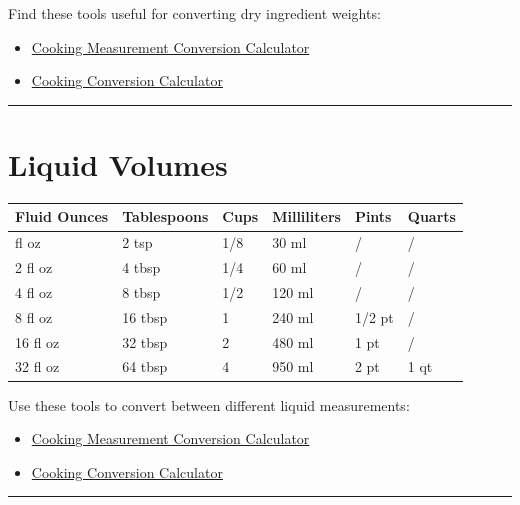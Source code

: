\documentclass[
]{book}
\providecommand{\tightlist}{%
  \setlength{\itemsep}{0pt}\setlength{\parskip}{0pt}}
\begin{document}
Find these tools useful for converting dry ingredient weights:

\begin{itemize}
\tightlist
\item
  \href{https://goodcalculators.com/cooking-conversion-calculator/}{Cooking
  Measurement Conversion Calculator}
\item
  \href{https://www.inchcalculator.com/cooking-conversion-calculator/}{Cooking
  Conversion Calculator}
\end{itemize}

\begin{center}\rule{0.5\linewidth}{0.5pt}\end{center}

\section*{Liquid Volumes}\label{liquid-volumes}

\begin{longtable}[]{@{}llllll@{}}
\toprule\noalign{}
Fluid Ounces & Tablespoons & Cups & Milliliters & Pints & Quarts \\
\midrule\noalign{}
\endhead
\bottomrule\noalign{}
\endlastfoot
1 fl oz & 2 tsp & 1/8 & 30 ml & / & / \\
2 fl oz & 4 tbsp & 1/4 & 60 ml & / & / \\
4 fl oz & 8 tbsp & 1/2 & 120 ml & / & / \\
8 fl oz & 16 tbsp & 1 & 240 ml & 1/2 pt & / \\
16 fl oz & 32 tbsp & 2 & 480 ml & 1 pt & / \\
32 fl oz & 64 tbsp & 4 & 950 ml & 2 pt & 1 qt \\
\end{longtable}

Use these tools to convert between different liquid measurements:

\begin{itemize}
\tightlist
\item
  \href{https://goodcalculators.com/cooking-conversion-calculator/}{Cooking
  Measurement Conversion Calculator}
\item
  \href{https://www.inchcalculator.com/cooking-conversion-calculator/}{Cooking
  Conversion Calculator}
\end{itemize}

\begin{center}\rule{0.5\linewidth}{0.5pt}\end{center}
\end{document}
